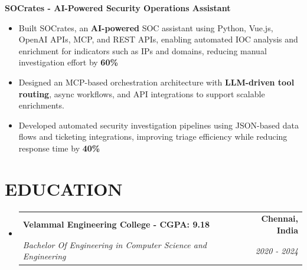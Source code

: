 \documentclass[letterpaper,11pt]{article}
\makeatletter
\newcommand{\resumeItem}[1]{%
  \item\small{%
    {#1\vspace{-2pt}}%
  }%
}
\newcommand{\resumeSubheading}[4]{
  \vspace{-2pt}\item
    \begin{tabular*}{1.0\textwidth}[t]{l@{\extracolsep{\fill}}r}
      \textbf{\large#1} & \textbf{\small #2} \\
      \textit{\large#3} & \textit{\small #4} \\
      
    \end{tabular*}\vspace{-9pt}
}
\newcommand{\resumeSubHeadingListStart}{\begin{itemize}[leftmargin=0.0in, label={}]}
\newcommand{\resumeSubHeadingListEnd}{\end{itemize}}
\newcommand{\resumeItemListStart}{\begin{itemize}[leftmargin=0.1in]}
\newcommand{\resumeItemListEnd}{\end{itemize}\vspace{-6pt}}
\makeatother
\begin{document}
        \resumeItem{\normalsize{\textbf{SOCrates - AI-Powered Security Operations Assistant}}}\vspace{-8px}

        \resumeItemListStart
            \resumeItem{\normalsize{Built SOCrates, an \textbf{AI-powered} SOC assistant using Python, Vue.js, OpenAI APIs, MCP, and REST APIs, enabling automated IOC analysis and enrichment for indicators such as IPs and domains, reducing manual investigation effort by \textbf{60\%}}}
            \resumeItem{\normalsize{Designed an MCP-based orchestration architecture with \textbf{LLM-driven tool routing}, async workflows, and API integrations to support scalable enrichments.}}  
            \resumeItem{\normalsize{Developed automated security investigation pipelines using JSON-based data flows and ticketing integrations, improving triage efficiency while reducing response time by \textbf{40\%}}}
      \resumeItemListEnd 
   
 \vspace{-14pt}
%

\section{\color{airforceblue}EDUCATION}
  \resumeSubHeadingListStart
    \resumeSubheading
      {Velammal Engineering College \textnormal{\small - CGPA: 9.18}}{Chennai, India}
      {Bachelor Of Engineering in Computer Science and Engineering}{2020 - 2024}
    \vspace{-4pt}
  \resumeSubHeadingListEnd
  \vspace{-3pt}


      
\vspace{-14pt}
\end{document}
